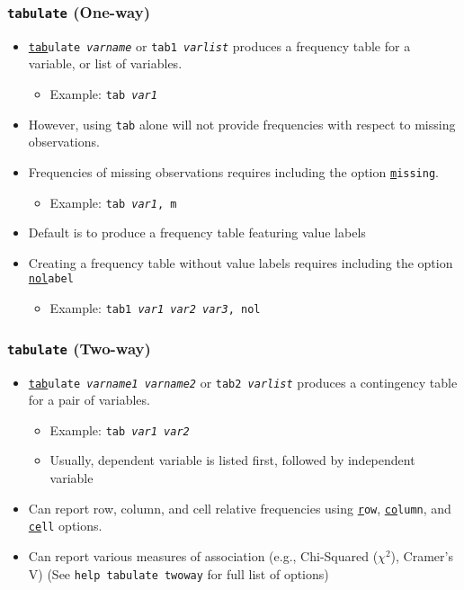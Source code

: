 \documentclass{beamer}
\begin{document}
\begin{frame}
	\frametitle{\texttt{tabulate} (One-way)}
		\begin{itemize}
			\item \texttt{\underline{tab}ulate \textit{varname}} or \texttt{tab1 \textit{varlist}} produces a frequency table for a variable, or list of variables.
				\begin{itemize}
					\item Example: \texttt{tab \textit{var1}}
				\end{itemize}
			\item However, using \texttt{tab} alone will not provide frequencies with respect to missing observations.
			\item Frequencies of missing observations requires including the option \texttt{\underline{m}issing}.
				\begin{itemize}
					\item Example: \texttt{tab \textit{var1}, m}
				\end{itemize}
			\item Default is to produce a frequency table featuring value labels
			\item Creating a frequency table without value labels requires including the option \texttt{\underline{nol}abel}
				\begin{itemize}
					\item Example: \texttt{tab1 \textit{var1 var2 var3}, nol}
				\end{itemize}
		\end{itemize}
\end{frame}

\begin{frame}
	\frametitle{\texttt{tabulate} (Two-way)}
		\begin{itemize}
			\item \texttt{\underline{tab}ulate \textit{varname1} \textit{varname2}} or \texttt{tab2 \textit{varlist}} produces a contingency table for a pair of variables.
				\begin{itemize}
					\item Example: \texttt{tab \textit{var1} \textit{var2}}
					\item Usually, dependent variable is listed first, followed by independent variable
				\end{itemize}
			\item Can report row, column, and cell relative frequencies using \texttt{\underline{r}ow}, \texttt{\underline{co}lumn}, and \texttt{\underline{ce}ll} options.
			\item Can report various measures of association (e.g., Chi-Squared ($\chi^2$), Cramer's V) (See \texttt{help tabulate twoway} for full list of options)
		\end{itemize}
\end{frame}
\end{document}

